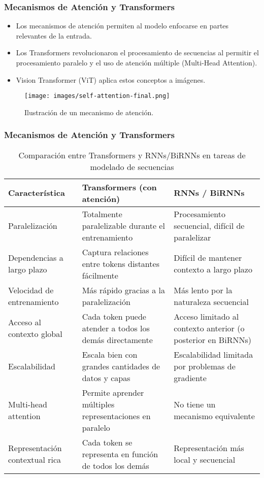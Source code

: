 \begin{frame}
\frametitle{Mecanismos de Atención y Transformers}
\begin{itemize}
    \item Los mecanismos de atención permiten al modelo enfocarse en partes relevantes de la entrada.
    \item Los Transformers revolucionaron el procesamiento de secuencias al permitir el procesamiento paralelo y el uso de atención múltiple (Multi-Head Attention).
    \item Vision Transformer (ViT) aplica estos conceptos a imágenes.
\end{itemize}
\begin{figure}[ht!]
    \centering
    \texttt{[image: images/self-attention-final.png]}
    \caption{Ilustración de un mecanismo de atención.}
\end{figure}
\end{frame}

\begin{frame}
\frametitle{Mecanismos de Atención y Transformers}
\begin{table}[h!]
    \centering
    \fontsize{8}{9}\selectfont
    \begin{tabular}{|p{3cm}|p{3.5cm}|p{3.5cm}|}
        \hline
        \textbf{Característica} & \textbf{Transformers (con atención)} & \textbf{RNNs / BiRNNs} \\
        \hline
        Paralelización & Totalmente paralelizable durante el entrenamiento & Procesamiento secuencial, difícil de paralelizar \\
        \hline
        Dependencias a largo plazo & Captura relaciones entre tokens distantes fácilmente & Difícil de mantener contexto a largo plazo \\
        \hline
        Velocidad de entrenamiento & Más rápido gracias a la paralelización & Más lento por la naturaleza secuencial \\
        \hline
        Acceso al contexto global & Cada token puede atender a todos los demás directamente & Acceso limitado al contexto anterior (o posterior en BiRNNs) \\
        \hline
        Escalabilidad & Escala bien con grandes cantidades de datos y capas & Escalabilidad limitada por problemas de gradiente \\
        \hline
        Multi-head attention & Permite aprender múltiples representaciones en paralelo & No tiene un mecanismo equivalente \\
        \hline
        Representación contextual rica & Cada token se representa en función de todos los demás & Representación más local y secuencial \\
        \hline
    \end{tabular}
    \caption{Comparación entre Transformers y RNNs/BiRNNs en tareas de modelado de secuencias}
    \label{tab:comparacion_transformers_rnns}
\end{table}    
\end{frame}

